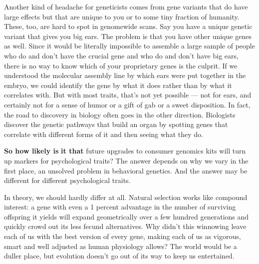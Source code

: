 Another kind of headache for geneticists comes from gene variants that
do have large effects but that are unique to you or to some tiny
fraction of humanity. These, too, are hard to spot in genomewide scans.
Say you have a unique genetic variant that gives you big ears. The
problem is that you have other unique genes as well. Since it would be
literally impossible to assemble a large sample of people who do and
don't have the crucial gene and who do and don't have big ears, there is
no way to know which of your proprietary genes is the culprit. If we
understood the molecular assembly line by which ears were put together
in the embryo, we could identify the gene by what it does rather than by
what it correlates with. But with most traits, that's not yet possible
--- not for ears, and certainly not for a sense of humor or a gift of
gab or a sweet disposition. In fact, the road to discovery in biology
often goes in the other direction. Biologists discover the genetic
pathways that build an organ by spotting genes that correlate with
different forms of it and then seeing what they do.

\textbf{So how likely is} \textbf{it that} future upgrades to consumer
genomics kits will turn up markers for psychological traits? The answer
depends on why we vary in the first place, an unsolved problem in
behavioral genetics. And the answer may be different for different
psychological traits.

In theory, we should hardly differ at all. Natural selection works like
compound interest: a gene with even a 1 percent advantage in the number
of surviving offspring it yields will expand geometrically over a few
hundred generations and quickly crowd out its less fecund alternatives.
Why didn't this winnowing leave each of us with the best version of
every gene, making each of us as vigorous, smart and well adjusted as
human physiology allows? The world would be a duller place, but
evolution doesn't go out of its way to keep us entertained.

